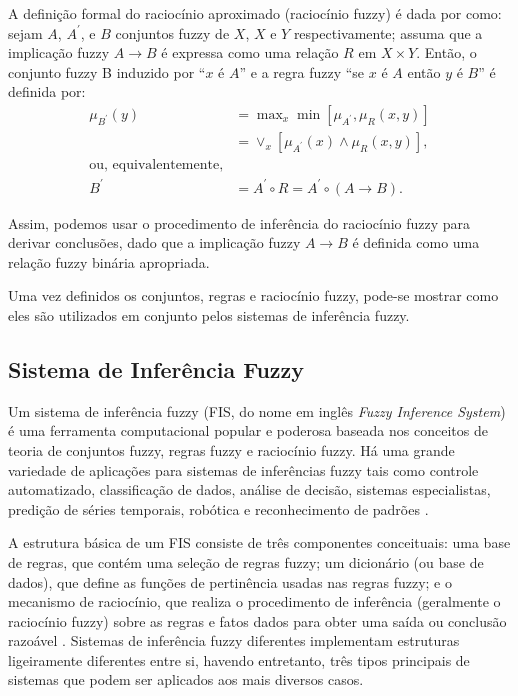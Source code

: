 A definição formal do raciocínio aproximado (raciocínio fuzzy) é dada por  como: sejam $A$, $A^\prime$, e $B$ conjuntos fuzzy de $X$, $X$ e $Y$ respectivamente; assuma que a implicação fuzzy $A \rightarrow B$ é expressa como uma relação $R$ em $X \times Y$. Então, o conjunto fuzzy B induzido por ``$x$ é $A$'' e a regra fuzzy ``se $x$ é $A$ então $y$ é $B$'' é definida por:
\begin{align*}
\mu_{B^\prime}(y) &= \max\nolimits_x \min[\mu_{A^\prime}, \mu_R(x,y)]
\\
&= \vee_x[\mu_{A^\prime}(x) \wedge \mu_R(x,y)], \\
\mbox{ou, equivalentemente,} \\
B^\prime &= A^\prime \circ R = A^\prime \circ (A \rightarrow B).
\end{align*}
 
Assim, podemos usar o procedimento de inferência do raciocínio fuzzy para derivar conclusões, dado que a implicação fuzzy $A \rightarrow B$ é definida como uma relação fuzzy binária apropriada.

Uma vez definidos os conjuntos, regras e raciocínio fuzzy, pode-se mostrar como eles são utilizados em conjunto pelos sistemas de inferência fuzzy.
 
\subsection{Sistema de Inferência Fuzzy}
\label{sec:sistema_inferencai_fuzzy}

Um sistema de inferência fuzzy (FIS, do nome em inglês \textit{Fuzzy Inference System}) é uma ferramenta computacional popular e poderosa baseada nos conceitos de teoria de conjuntos fuzzy, regras fuzzy e raciocínio fuzzy. Há uma grande variedade de aplicações para sistemas de inferências fuzzy tais como controle automatizado, classificação de dados, análise de decisão, sistemas especialistas, predição de séries temporais, robótica e reconhecimento de padrões \cite[p.~73]{Jang1997}.

A estrutura básica de um FIS consiste de três componentes conceituais: uma base de regras, que contém uma seleção de regras fuzzy; um dicionário (ou base de dados), que define as funções de pertinência usadas nas regras fuzzy; e o mecanismo de raciocínio, que realiza o procedimento de inferência (geralmente o raciocínio fuzzy) sobre as regras e fatos dados para obter uma saída ou conclusão razoável \cite[p.~73]{Jang1997}. Sistemas de inferência fuzzy diferentes implementam estruturas ligeiramente diferentes entre si, havendo entretanto, três tipos principais de sistemas que podem ser aplicados aos mais diversos casos.

